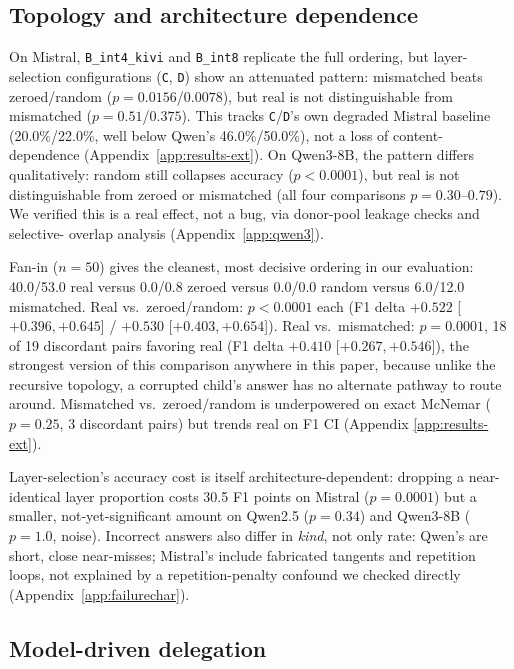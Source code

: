 \documentclass[11pt]{article}
\begin{document}
\subsection{Topology and architecture dependence}

On Mistral, \texttt{B\_int4\_kivi} and \texttt{B\_int8} replicate the
full ordering, but layer-selection configurations (\texttt{C},
\texttt{D}) show an attenuated pattern: mismatched beats zeroed/random
($p=0.0156$/$0.0078$), but real is not distinguishable from mismatched
($p=0.51$/$0.375$). This tracks \texttt{C}/\texttt{D}'s own degraded
Mistral baseline (20.0\%/22.0\%, well below Qwen's 46.0\%/50.0\%), not
a loss of content-dependence (Appendix~\ref{app:results-ext}). On
Qwen3-8B, the pattern differs qualitatively: random still collapses
accuracy ($p<0.0001$), but real is not distinguishable from zeroed or
mismatched (all four comparisons $p=0.30$--$0.79$). We verified this is
a real effect, not a bug, via donor-pool leakage checks and selective-
overlap analysis (Appendix~\ref{app:qwen3}).

Fan-in ($n=50$) gives the cleanest, most decisive ordering in our
evaluation: 40.0/53.0 real versus 0.0/0.8 zeroed versus 0.0/0.0 random
versus 6.0/12.0 mismatched. Real vs.\ zeroed/random: $p<0.0001$ each
(F1 delta $+0.522$ [$+0.396,+0.645$] / $+0.530$ [$+0.403,+0.654$]).
Real vs.\ mismatched: $p=0.0001$, 18 of 19 discordant pairs favoring
real (F1 delta $+0.410$ [$+0.267,+0.546$]), the strongest version of
this comparison anywhere in this
paper, because unlike the recursive topology, a corrupted child's
answer has no alternate pathway to route around. Mismatched
vs.\ zeroed/random is underpowered on exact McNemar ($p=0.25$, 3
discordant pairs) but trends real on F1 CI (Appendix
\ref{app:results-ext}).

Layer-selection's accuracy cost is itself architecture-dependent:
dropping a near-identical layer proportion costs 30.5 F1 points on
Mistral ($p=0.0001$) but a smaller, not-yet-significant amount on
Qwen2.5 ($p=0.34$) and Qwen3-8B ($p=1.0$, noise). Incorrect answers
also differ in \emph{kind}, not only rate: Qwen's are short, close
near-misses; Mistral's include fabricated tangents and repetition
loops, not explained by a repetition-penalty confound we checked
directly (Appendix~\ref{app:failurechar}).

\subsection{Model-driven delegation}
\end{document}
